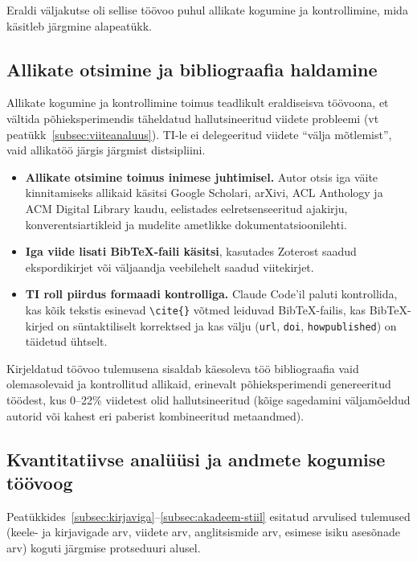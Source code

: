 Eraldi väljakutse oli sellise töövoo puhul allikate kogumine ja kontrollimine, mida käsitleb järgmine alapeatükk.

\subsection{Allikate otsimine ja bibliograafia haldamine} \label{subsec:allikad}

Allikate kogumine ja kontrollimine toimus teadlikult eraldiseisva töövoona, et vältida põhieksperimendis täheldatud hallutsineeritud viidete probleemi (vt peatükk~\ref{subsec:viiteanaluus}). TI-le ei delegeeritud viidete ``välja mõtlemist'', vaid allikatöö järgis järgmist distsipliini.

\begin{itemize}
    \item \textbf{Allikate otsimine toimus inimese juhtimisel.} Autor otsis iga väite kinnitamiseks allikaid käsitsi Google Scholari, arXivi, ACL Anthology ja ACM Digital Library kaudu, eelistades eelretsenseeritud ajakirju, konverentsiartikleid ja mudelite ametlikke dokumentatsioonilehti.
    \item \textbf{Iga viide lisati BibTeX-faili käsitsi}, kasutades Zoterost saadud ekspordikirjet või väljaandja veebilehelt saadud viitekirjet.
    \item \textbf{TI roll piirdus formaadi kontrolliga.} Claude Code'il paluti kontrollida, kas kõik tekstis esinevad \texttt{\textbackslash cite\{\}} võtmed leiduvad BibTeX-failis, kas BibTeX-kirjed on süntaktiliselt korrektsed ja kas välju (\texttt{url}, \texttt{doi}, \texttt{howpublished}) on täidetud ühtselt.
\end{itemize}

Kirjeldatud töövoo tulemusena sisaldab käesoleva töö bibliograafia vaid olemasolevaid ja kontrollitud allikaid, erinevalt põhieksperimendi genereeritud töödest, kus 0--22\% viidetest olid hallutsineeritud (kõige sagedamini väljamõeldud autorid või kahest eri paberist kombineeritud metaandmed).

\subsection{Kvantitatiivse analüüsi ja andmete kogumise töövoog} \label{subsec:kvantanaluus-toovoog}

Peatükkides~\ref{subsec:kirjaviga}--\ref{subsec:akadeem-stiil} esitatud arvulised tulemused (keele- ja kirjavigade arv, viidete arv, anglitsismide arv, esimese isiku asesõnade arv) koguti järgmise protseduuri alusel.

